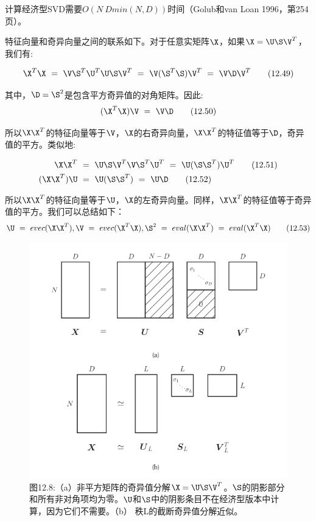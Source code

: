 \documentclass[a4paper]{article}
\begin{document}
计算经济型SVD需要$O(N\ Dmin(N,D))$时间（Golub和van Loan 1996，第254页）。 

特征向量和奇异向量之间的联系如下。对于任意实矩阵$\X$，如果$\X=\U\S\V^T$，我们有:

\begin{equation}
	\X^T\X\ =\ \V\S^T\U^T\U\S\V^T\ =\ \V(\S^T\S)\V^T\ =\ \V\D\V^T\tag{12.49}
\end{equation}

其中，$\D=\S^2$是包含平方奇异值的对角矩阵。因此:
\begin{equation}
	(\X^T\X)\V\ =\ \V\D\tag{12.50}
\end{equation}

所以$\X\X^T$的特征向量等于$\V$，$\X$的右奇异向量，$\X\X^T$的特征值等于$\D$，奇异值的平方。类似地:
 
\begin{align}
	\X\X^T\ &=\ \U\S\V^T\V\S^T\U^T\ =\ \U(\S\S^T)\U^T\tag{12.51}\\
	(\X\X^T)\U\ &=\ \U(\S\S^T)\ =\ \U\D\tag{12.52}
\end{align}

所以$\X\X^T$的特征向量等于$\U$，$\X$的左奇异向量。同样，$\X\X^T$的特征值等于奇异值的平方。我们可以总结如下：
\begin{equation}
	\U\ =\ evec(\X\X^T),\V\ =\ evec(\X^T\X),\S^2\ =\ eval(\X\X^T)\ =\ eval(\X^T\X)\tag{12.53}
\end{equation}

\begin{figure}[h]
	\centering
	\includegraphics[width=0.7\linewidth]{fig/figure8}
	\caption*{图12.8:（a）非平方矩阵的奇异值分解$\X=\U\S\V^T$。$\S$的阴影部分和所有非对角项均为零。$\U$和$\S$中的阴影条目不在经济型版本中计算，因为它们不需要。（b） 秩L的截断奇异值分解近似。 }
\end{figure}
\end{document}
